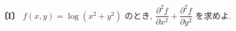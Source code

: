\noindent\textbf{〔I〕}
$f(x,y)=\log(x^2+y^2)$ のとき,
$\dfrac{\partial^2 f}{\partial x^2}+\dfrac{\partial^2 f}{\partial y^2}$
を求めよ.
